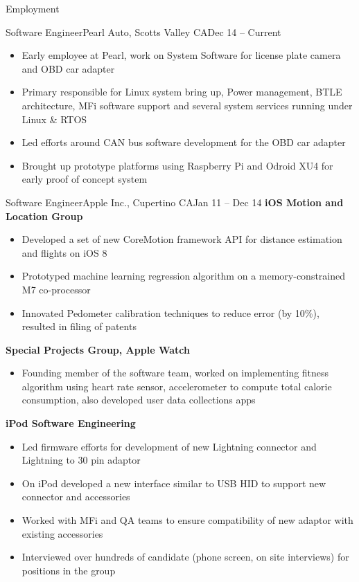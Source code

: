\documentclass[]{mcdowellcv}
\begin{document}
	\makeheader
	
	\begin{cvsection}{Employment}
		\begin{cvsubsection}{Software Engineer}{Pearl Auto, Scotts Valley CA}{Dec 14 -- Current}
			\begin{itemize}
				\item Early employee at Pearl, work on System Software for license plate camera and OBD car adapter
				\item Primary responsible for Linux system bring up, Power management, BTLE architecture, MFi software support and several system services running under Linux \& RTOS
				\item Led efforts around CAN bus software development for the OBD car adapter
				\item Brought up prototype platforms using Raspberry Pi and Odroid XU4 for early proof of concept system
			\end{itemize}
		\end{cvsubsection}
		
		\begin{cvsubsection}{Software Engineer}{Apple Inc., Cupertino CA}{Jan 11 -- Dec 14}	
			\textbf{iOS Motion and Location Group}
			\begin{itemize}
				\item Developed a set of new CoreMotion framework API for distance estimation and flights on iOS 8
				\item Prototyped machine learning regression algorithm on a memory-constrained M7 co-processor
				\item Innovated Pedometer calibration techniques to reduce error (by 10\%), resulted in filing of patents
			\end{itemize}

			\textbf{Special Projects Group, Apple Watch}
			\begin{itemize}
				\item Founding member of the software team, worked on implementing fitness algorithm using heart rate sensor, accelerometer to compute total calorie consumption, also developed user data collections apps
			\end{itemize}

			\textbf{iPod Software Engineering}
			\begin{itemize}
				\item Led firmware efforts for development of new Lightning connector and Lightning to 30 pin adaptor
				\item On iPod developed a new interface similar to USB HID to support new connector and accessories
				\item Worked with MFi and QA teams to ensure compatibility of new adaptor with existing accessories
				\item Interviewed over hundreds of candidate (phone screen, on site interviews) for positions in the group
			\end{itemize}
		\end{cvsubsection}
		

\end{cvsection}
\end{document}
